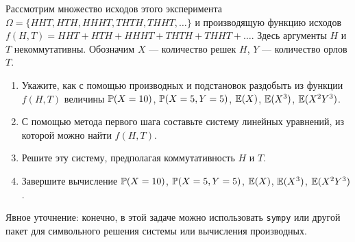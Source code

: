 \begin{enumerate}
Рассмотрим множество исходов этого эксперимента $\Omega = \{HHT, HTH, HHHT, THTH, THHT, \dots \}$
и производящую функцию исходов $f(H, T) = HHT + HTH + HHHT + THTH + THHT + \dots$.
Здесь аргументы $H$ и $T$ некоммутативны. 
Обозначим $X$ — количество решек $H$, $Y$ — количество орлов $T$.

\begin{enumerate}
    \item Укажите, как с помощью производных и подстановок раздобыть из функции $f(H, T)$ величины $\P(X = 10)$,
    $\P(X = 5, Y=5)$, $\E(X)$, $\E(X^3)$, $\E(X^2Y^3)$.
    \item С помощью метода первого шага составьте систему линейных уравнений, из которой можно найти $f(H, T)$. 
    \item Решите эту систему, предполагая коммутативность $H$ и $T$. 
    \item Завершите вычисление $\P(X = 10)$, $\P(X = 5, Y=5)$, $\E(X)$, $\E(X^3)$, $\E(X^2Y^3)$.
\end{enumerate}

Явное уточнение: конечно, в этой задаче можно использовать \verb|sympy| или другой пакет для символьного решения системы или вычисления производных. 

\end{enumerate}
